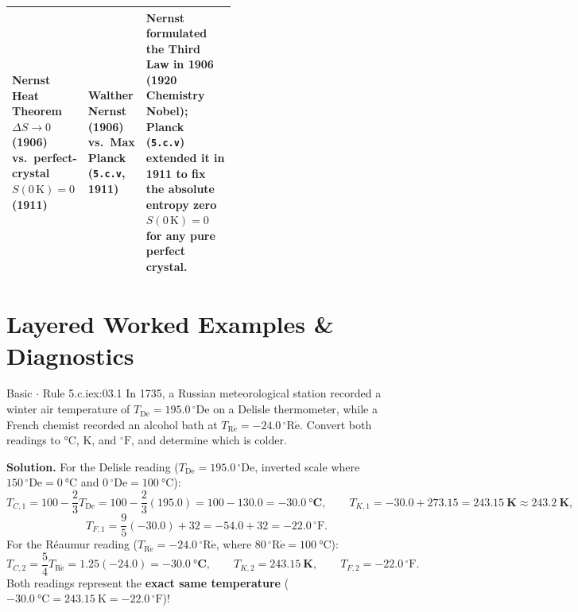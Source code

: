\begin{center}
\begin{tabularx}{\linewidth}{@{}p{0.31\linewidth} p{0.25\linewidth} X@{}}
Nernst Heat Theorem $\Delta S \to 0$ (1906) vs.\ perfect-crystal $S(0\,\si{\kelvin}) = 0$ (1911) & \textbf{Walther Nernst} (1906) vs.\ \textbf{Max Planck} (\texttt{5.c.v}, 1911) & Nernst formulated the Third Law in 1906 (1920 Chemistry Nobel); \textbf{Planck} (\texttt{5.c.v}) extended it in 1911 to fix the absolute entropy zero $S(0\,\si{\kelvin}) = 0$ for any pure perfect crystal. \\\bottomrule
\end{tabularx}
\end{center}

\section{Layered Worked Examples \& Diagnostics}
\label{sec:03.5}

\begin{workedexample}{Basic $\cdot$ Rule 5.c.i}{ex:03.1}
In 1735, a Russian meteorological station recorded a winter air temperature of $T_{\mathrm{De}} = 195.0\,^\circ\mathrm{De}$ on a Delisle thermometer, while a French chemist recorded an alcohol bath at $T_{\mathrm{R\acute{e}}} = -24.0\,^\circ\mathrm{R\acute{e}}$. Convert both readings to $\si{\celsius}$, $\si{\kelvin}$, and $^\circ\mathrm{F}$, and determine which is colder.

\textbf{Solution.}
For the Delisle reading ($T_{\mathrm{De}} = 195.0\,^\circ\mathrm{De}$, inverted scale where $150\,^\circ\mathrm{De} = \SI{0}{\celsius}$ and $0\,^\circ\mathrm{De} = \SI{100}{\celsius}$):
\[
  T_{C,1} = 100 - \frac{2}{3}T_{\mathrm{De}} = 100 - \frac{2}{3}(195.0) = 100 - 130.0 = \mathbf{-\SI{30.0}{\celsius}}, \qquad
  T_{K,1} = -30.0 + 273.15 = \mathbf{\SI{243.15}{\kelvin} \approx \SI{243.2}{\kelvin}},
\]
\[
  T_{F,1} = \frac{9}{5}(-30.0) + 32 = -54.0 + 32 = \mathbf{-22.0\,^\circ\mathrm{F}}.
\]
For the R\'eaumur reading ($T_{\mathrm{R\acute{e}}} = -24.0\,^\circ\mathrm{R\acute{e}}$, where $80\,^\circ\mathrm{R\acute{e}} = \SI{100}{\celsius}$):
\[
  T_{C,2} = \frac{5}{4}T_{\mathrm{R\acute{e}}} = 1.25(-24.0) = \mathbf{-\SI{30.0}{\celsius}}, \qquad
  T_{K,2} = \mathbf{\SI{243.15}{\kelvin}}, \qquad T_{F,2} = \mathbf{-22.0\,^\circ\mathrm{F}}.
\]
Both readings represent the \textbf{exact same temperature} ($-\SI{30.0}{\celsius} = \SI{243.15}{\kelvin} = -22.0\,^\circ\mathrm{F}$)!
\end{workedexample}

